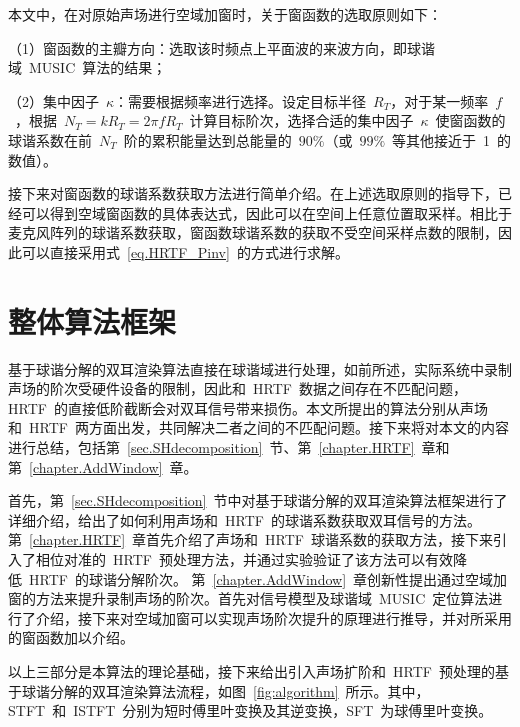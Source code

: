 本文中，在对原始声场进行空域加窗时，关于窗函数的选取原则如下：

（1）窗函数的主瓣方向：选取该时频点上平面波的来波方向，即球谐域~MUSIC~算法的结果；

（2）集中因子~$\kappa$：需要根据频率进行选择。设定目标半径~$R_{T}$，对于某一频率~$f$~，根据~$N_{T} = k R_{T} = 2\pi f R_{T}$~计算目标阶次，选择合适的集中因子~$\kappa$~使窗函数的球谐系数在前~$N_{T}$~阶的累积能量达到总能量的~$90\%$（或~$99\%$~等其他接近于~1~的数值）。

接下来对窗函数的球谐系数获取方法进行简单介绍。在上述选取原则的指导下，已经可以得到空域窗函数的具体表达式，因此可以在空间上任意位置取采样。相比于麦克风阵列的球谐系数获取，窗函数球谐系数的获取不受空间采样点数的限制，因此可以直接采用式~\eqref{eq.HRTF_Pinv}~的方式进行求解。


\section{整体算法框架}

基于球谐分解的双耳渲染算法直接在球谐域进行处理，如前所述，实际系统中录制声场的阶次受硬件设备的限制，因此和~HRTF~数据之间存在不匹配问题，HRTF~的直接低阶截断会对双耳信号带来损伤。本文所提出的算法分别从声场和~HRTF~两方面出发，共同解决二者之间的不匹配问题。接下来将对本文的内容进行总结，包括第~\ref{sec.SHdecomposition}~节、第~\ref{chapter.HRTF}~章和第~\ref{chapter.AddWindow}~章。


首先，第~\ref{sec.SHdecomposition}~节中对基于球谐分解的双耳渲染算法框架进行了详细介绍，给出了如何利用声场和~HRTF~的球谐系数获取双耳信号的方法。
第~\ref{chapter.HRTF}~章首先介绍了声场和~HRTF~球谐系数的获取方法，接下来引入了相位对准的~HRTF~预处理方法，并通过实验验证了该方法可以有效降低~HRTF~的球谐分解阶次。
第~\ref{chapter.AddWindow}~章创新性提出通过空域加窗的方法来提升录制声场的阶次。首先对信号模型及球谐域~MUSIC~定位算法进行了介绍，接下来对空域加窗可以实现声场阶次提升的原理进行推导，并对所采用的窗函数加以介绍。

以上三部分是本算法的理论基础，接下来给出引入声场扩阶和~HRTF~预处理的基于球谐分解的双耳渲染算法流程，如图~\ref{fig:algorithm}~所示。其中，STFT~和~ISTFT~分别为短时傅里叶变换及其逆变换，SFT~为球傅里叶变换。

